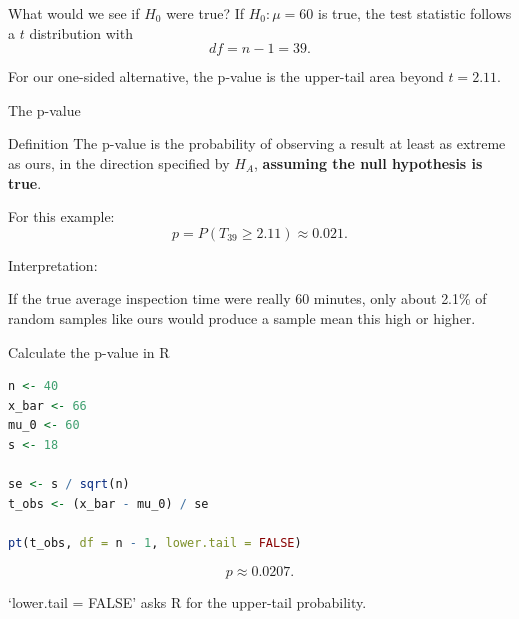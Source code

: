 \documentclass[11pt,aspectratio=169]{beamer}
\begin{document}
\begin{frame}{What would we see if $H_0$ were true?}
If $H_0:\mu=60$ is true, the test statistic follows a $t$ distribution with
\[
df=n-1=39.
\]

\begin{center}
\end{center}

For our one-sided alternative, the p-value is the \alert{upper-tail area beyond $t=2.11$}.
\end{frame}

\begin{frame}{The p-value}
\begin{alertblock}{Definition}
The p-value is the probability of observing a result at least as extreme as ours, in the direction specified by $H_A$, \textbf{assuming the null hypothesis is true}.
\end{alertblock}

For this example:
\[
p=P(T_{39}\ge2.11)\approx0.021.
\]

\vfill
Interpretation:

If the true average inspection time were really 60 minutes, only about \alert{2.1\%} of random samples like ours would produce a sample mean this high or higher.
\end{frame}

\begin{frame}[fragile]{Calculate the p-value in R}
\begin{lstlisting}[language=R]
n <- 40
x_bar <- 66
mu_0 <- 60
s <- 18

se <- s / sqrt(n)
t_obs <- (x_bar - mu_0) / se

pt(t_obs, df = n - 1, lower.tail = FALSE)
\end{lstlisting}

\[
p\approx0.0207.
\]

\vfill
\alert{`lower.tail = FALSE' asks R for the upper-tail probability.}
\end{frame}
\end{document}
